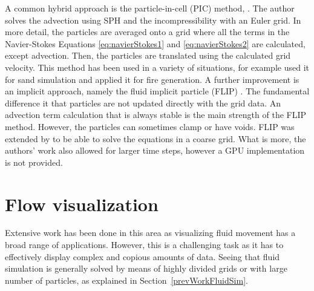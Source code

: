 A common hybrid approach is the particle-in-cell (PIC) method, \cite{Harlow1962}.
The author solves the advection using SPH and the incompressibility with an Euler grid.
In more detail, the particles are averaged onto a grid where all the terms in the Navier-Stokes Equations \ref{eq:navierStokes1} and \ref{eq:navierStokes2} are calculated, except advection.
Then, the particles are translated using the calculated grid velocity.
This method has been used in a variety of situations, for example \cite{Zhu2005} used it for sand simulation and \cite{Horvath2009} applied it for fire generation.
A further improvement is an implicit approach, namely the fluid implicit particle (FLIP) \cite{J.U.Brackbill1986}.
The fundamental difference it that particles are not updated directly with the grid data.
An advection term calculation that is always stable is the main strength of the FLIP method.
However, the particles can sometimes clamp or have voids.
FLIP was extended by \cite{Raveendran2011} to be able to solve the equations in a coarse grid.
What is more, the authors' work also allowed for larger time steps, however a GPU implementation is not provided.

\section{Flow visualization}
\label{sec:flowVisualization}


Extensive work has been done in this area as visualizing fluid movement has a broad range of applications.
However, this is a challenging task as it has to effectively display complex and copious amounts of data.
Seeing that fluid simulation is generally solved by means of highly divided grids or with large number of particles, as explained in Section~\ref{prevWorkFluidSim}.

